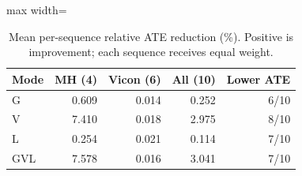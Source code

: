 \begin{table}[tb]
\caption{Mean per-sequence relative ATE reduction (\%). Positive is improvement; each sequence receives equal weight.}\label{tab:summary}
\centering\small
\begin{adjustbox}{max width=\columnwidth}
\begin{tabular}{lrrrr}
\toprule
Mode & MH (4) & Vicon (6) & All (10) & Lower ATE \\
\midrule
G & 0.609 & 0.014 & 0.252 & 6/10 \\
V & 7.410 & 0.018 & 2.975 & 8/10 \\
L & 0.254 & 0.021 & 0.114 & 7/10 \\
GVL & 7.578 & 0.016 & 3.041 & 7/10 \\
\bottomrule
\end{tabular}
\end{adjustbox}
\end{table}
